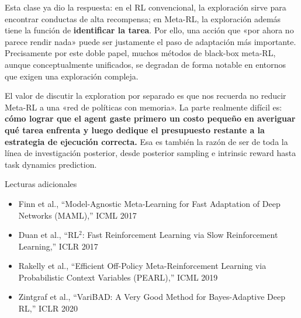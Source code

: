 \documentclass[a4paper]{article}
\begin{document}
Esta clase ya dio la respuesta: en el RL convencional, la exploración sirve para encontrar conductas de alta recompensa; en Meta-RL, la exploración además tiene la función de \textbf{identificar la tarea}. Por ello, una acción que «por ahora no parece rendir nada» puede ser justamente el paso de adaptación más importante. Precisamente por este doble papel, muchos métodos de black-box meta-RL, aunque conceptualmente unificados, se degradan de forma notable en entornos que exigen una exploración compleja.

El valor de discutir la exploration por separado es que nos recuerda no reducir Meta-RL a una «red de políticas con memoria». La parte realmente difícil es: \textbf{cómo lograr que el agent gaste primero un costo pequeño en averiguar qué tarea enfrenta y luego dedique el presupuesto restante a la estrategia de ejecución correcta.} Esa es también la razón de ser de toda la línea de investigación posterior, desde posterior sampling e intrinsic reward hasta task dynamics prediction.

\begin{knowledgebox}{Lecturas adicionales}
\begin{itemize}
    \item Finn et al., ``Model-Agnostic Meta-Learning for Fast Adaptation of Deep Networks (MAML),'' ICML 2017
    \item Duan et al., ``RL$^2$: Fast Reinforcement Learning via Slow Reinforcement Learning,'' ICLR 2017
    \item Rakelly et al., ``Efficient Off-Policy Meta-Reinforcement Learning via Probabilistic Context Variables (PEARL),'' ICML 2019
    \item Zintgraf et al., ``VariBAD: A Very Good Method for Bayes-Adaptive Deep RL,'' ICLR 2020
\end{itemize}
\end{knowledgebox}
\end{document}
